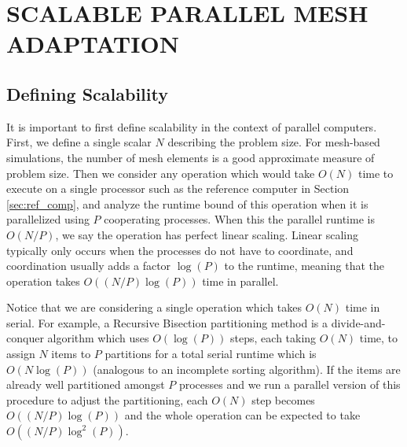 
\chapter{SCALABLE PARALLEL MESH ADAPTATION}
\label{chap:parallel}

\section{Defining Scalability}
\label{sec:scalable}

It is important to first define scalability in the context of
parallel computers.
First, we define a single scalar $N$ describing the problem size.
For mesh-based simulations, the number of mesh elements
is a good approximate measure of problem size.
Then we consider any operation which would take $O(N)$ time to execute
on a single processor such as the reference computer
in Section \ref{sec:ref_comp}, and analyze the runtime bound
of this operation when it is parallelized using $P$ cooperating processes.
When this the parallel runtime is $O(N/P)$, we say the operation
has perfect linear scaling.
Linear scaling typically only occurs when the processes do not have to coordinate,
and coordination usually adds a factor $\log(P)$ to the runtime,
meaning that the operation takes $O((N/P)\log(P))$ time in parallel.

Notice that we are considering a single operation which takes $O(N)$
time in serial.
For example, a Recursive Bisection partitioning method is a
divide-and-conquer algorithm which uses $O(\log(P))$ steps, each
taking $O(N)$ time, to assign $N$ items to $P$ partitions
for a total serial runtime which is $O(N\log(P))$
(analogous to an incomplete sorting algorithm).
If the items are already well partitioned amongst $P$ processes
and we run a parallel version of this procedure to adjust the
partitioning, each $O(N)$ step becomes $O((N/P)\log(P))$
and the whole operation can be expected to take $O((N/P)\log^2(P))$.

